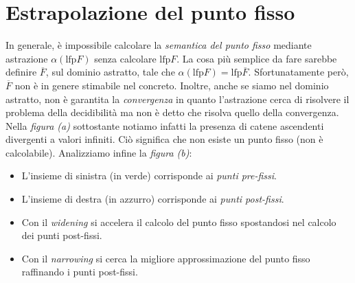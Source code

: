 \documentclass[a4paper,oneside,titlepage]{book}
\begin{document}
\section{Estrapolazione del punto fisso} %
In generale, è impossibile calcolare la \textit{semantica del punto fisso} mediante astrazione $\alpha(\text{lfp} F)$ senza calcolare $\text{lfp} F$. La cosa più semplice da fare sarebbe definire $\overline{F}$, sul dominio astratto, tale che $\alpha(\text{lfp} F) = \text{lfp} \overline{F}$. Sfortunatamente però, $\overline{F}$ non è in genere stimabile nel concreto. Inoltre, anche se siamo nel dominio astratto, non è garantita la \textit{convergenza} in quanto l'astrazione cerca di risolvere il problema della decidibilità ma non è detto che risolva quello della convergenza. Nella \textit{figura (a)} sottostante notiamo infatti la presenza di catene ascendenti divergenti a valori infiniti. Ciò significa che non esiste un punto fisso (non è calcolabile). Analizziamo infine la \textit{figura (b)}:
\begin{itemize}
    \item L'insieme di sinistra (in verde) corrisponde ai \textit{punti pre-fissi}.
    \item L'insieme di destra (in azzurro) corrisponde ai \textit{punti post-fissi}.
    \item Con il \textit{widening} si accelera il calcolo del punto fisso spostandosi nel calcolo dei punti post-fissi.
    \item Con il \textit{narrowing} si cerca la migliore approssimazione del punto fisso raffinando i punti post-fissi.
\end{itemize}
\end{document}
